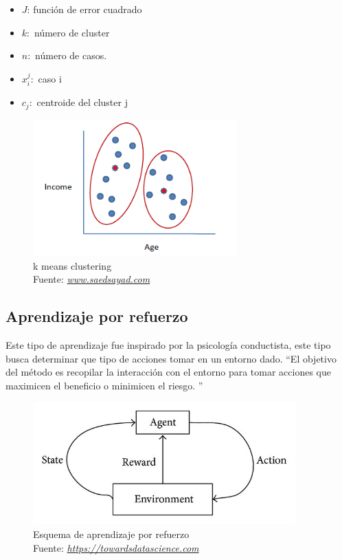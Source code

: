 \begin{itemize}
	\item $J$: función de error cuadrado
	\item $k:$ número de cluster
	\item $n:$ número de casos.
	\item $x_{i}^j:$ caso i
	\item $c_{j}:$ centroide del cluster j
\end{itemize}
\begin{figure}[H]
	\centering
	\includegraphics[width=0.7\textwidth]{Figures/kmeans.png}
	\caption{k means clustering\\ Fuente:  \href{http://www.saedsayad.com/clustering_kmeans.htm}{\textit{www.saedsayad.com}}}
	\label{kmeans}
\end{figure} 


\subsection{Aprendizaje por refuerzo}
Este tipo de aprendizaje fue inspirado por la psicología conductista, este tipo busca determinar que tipo de acciones tomar en un entorno dado. \textquotedblleft El objetivo del método es recopilar la interacción con el entorno para tomar acciones que maximicen el beneficio o minimicen el riesgo. \textquotedblright \cite{WEBSITE:1}
\begin{figure}[H]
	\centering
	\includegraphics[width=0.9\textwidth]{Figures/esquema.jpeg}
	\caption{Esquema de aprendizaje por refuerzo \\ Fuente:  \href{https://towardsdatascience.com/types-of-machine-learning-algorithms-you-should-know-953a08248861}{\textit{https://towardsdatascience.com}}}
	\label{refuerzo}
\end{figure} 


